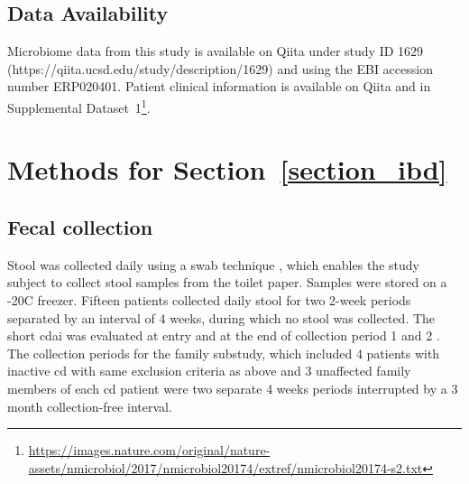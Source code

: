 \subsection{Data Availability}

Microbiome data from this study is available on Qiita under study ID 1629 
(https://qiita.ucsd.edu/study/description/1629) and using the EBI accession 
number ERP020401. Patient clinical information is available on Qiita and in 
Supplemental 
Dataset~1\footnote{\url{https://images.nature.com/original/nature-assets/nmicrobiol/2017/nmicrobiol20174/extref/nmicrobiol20174-s2.txt}}. 

\section{Methods for Section~\ref{section_ibd}}\label{appendix_ibd}

\subsection{Fecal collection}

Stool was collected daily using a swab technique \cite{RN4220}, which enables 
the study subject to collect stool samples from the toilet paper. Samples were 
stored on a -20\textdegree C freezer. Fifteen patients collected daily stool 
for two 2-week periods separated by an interval of 4 weeks, during which no 
stool was collected.  The short \gls{cdai} was evaluated at entry and at 
the end of collection period 1 and 2 \cite{RN4006}. The collection periods 
for the family substudy, which included 4 patients with inactive \gls{cd} 
with same exclusion criteria as above and 3 unaffected family members of 
each \gls{cd} patient were two separate 4 weeks periods interrupted by a 3 
month collection-free interval.

